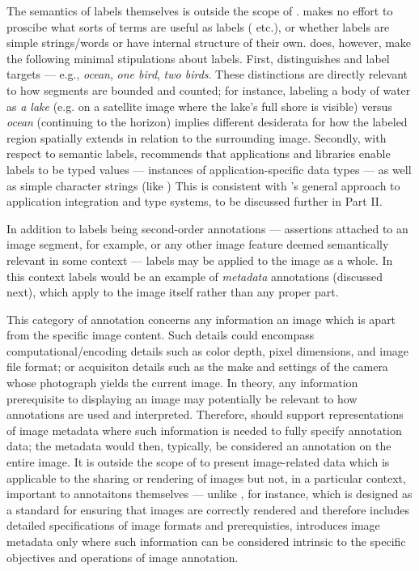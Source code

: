 {\begin{description}
The semantics of labels themselves is outside 
the scope of \AXFI{}.  \lAXFI{} makes no effort 
to proscibe what sorts of terms are useful 
as labels (   
 etc.), or whether labels are 
simple strings/words or have internal structure 
of their own.  \lAXFI{} does, however, 
make the following minimal stipulations about 
labels.  First, \AXFI{} distinguishes 
  and  label 
targets --- e.g., \textit{ocean}, \textit{one bird}, 
\textit{two birds}.  These distinctions are 
directly relevant to how segments are bounded and 
counted; for instance, labeling a body of water 
as \textit{a lake} (e.g. on a satellite image where 
the lake's full shore is visible) versus \textit{ocean} 
(continuing to the horizon) implies different 
desiderata for how the labeled region spatially extends 
in relation to the surrounding image.  Secondly, 
with respect to semantic labels, \AXFI{} recommends 
that applications and libraries enable 
labels to be typed values --- instances of 
application-specific data types --- as well 
as simple character strings (like )  
This is consistent with \AXFI{}'s general 
approach to application integration and 
type systems, to be discussed further in 
Part II. 

In addition to labels being second-order annotations 
--- assertions attached to an image segment, 
for example, or any other image feature deemed 
semantically relevant in some context --- labels 
may be applied to the image as a whole.  In this
context labels would be an example of 
\textit{metadata} annotations (discussed next), 
which apply to the image itself 
rather than any proper part. 


\item[Image Metadata]   This category 
of annotation concerns any information 
 an image which is apart from 
the specific image content.  Such details could encompass 
computational/encoding details such 
as color depth, pixel dimensions, and image 
file format; or acquisiton details 
such as the make and settings of the camera 
whose photograph yields the current image.  
In theory, any information prerequisite to 
displaying an image may potentially 
be relevant to how annotations are 
used and interpreted.  Therefore, 
\AXFI{} should support representations of 
image metadata where such information is needed 
to fully specify annotation data; the metadata 
would then, typically, be considered an 
annotation on the entire image.  It is 
outside the scope of \AXFI{} to present 
image-related data which is applicable  
to the sharing or rendering of images but 
not, in a particular context, important to 
annotaitons themselves --- unlike \DICOM{}, 
for instance, which is designed as a 
standard for ensuring that images are correctly 
rendered and therefore includes detailed 
specifications of image formats and 
prerequisties, \AXFI{} introduces 
image metadata only where such information 
can be considered intrinsic to the 
specific objectives and operations of image 
annotation.  


\end{description}}
